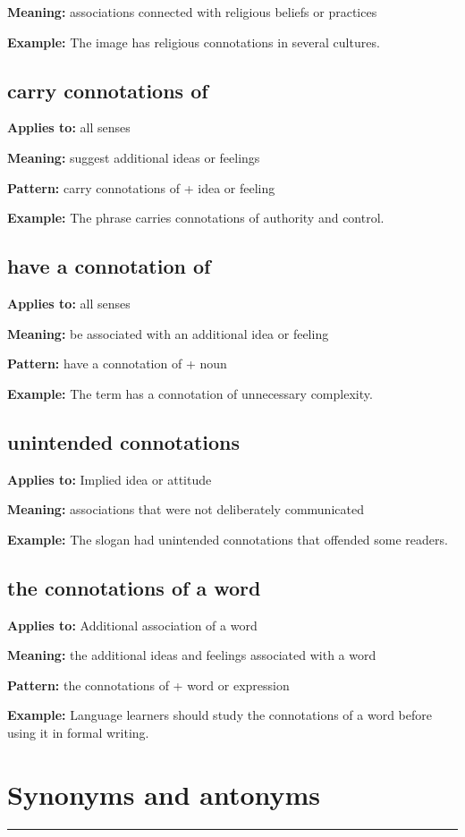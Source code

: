 \documentclass[11pt]{article}
\newcommand{\sectionrule}{\par\vspace{-0.5em}\noindent\textcolor{Accent}{\rule{\linewidth}{0.6pt}}\par}
\begin{document}
\textbf{Meaning:} associations connected with religious beliefs or practices

\textbf{Example:} The image has religious connotations in several cultures.

\subsection{carry connotations of}
\textbf{Applies to:} all senses

\textbf{Meaning:} suggest additional ideas or feelings

\textbf{Pattern:} carry connotations of + idea or feeling

\textbf{Example:} The phrase carries connotations of authority and control.

\subsection{have a connotation of}
\textbf{Applies to:} all senses

\textbf{Meaning:} be associated with an additional idea or feeling

\textbf{Pattern:} have a connotation of + noun

\textbf{Example:} The term has a connotation of unnecessary complexity.

\subsection{unintended connotations}
\textbf{Applies to:} Implied idea or attitude

\textbf{Meaning:} associations that were not deliberately communicated

\textbf{Example:} The slogan had unintended connotations that offended some readers.

\subsection{the connotations of a word}
\textbf{Applies to:} Additional association of a word

\textbf{Meaning:} the additional ideas and feelings associated with a word

\textbf{Pattern:} the connotations of + word or expression

\textbf{Example:} Language learners should study the connotations of a word before using it in formal writing.

\section{Synonyms and antonyms}
\sectionrule
\end{document}
